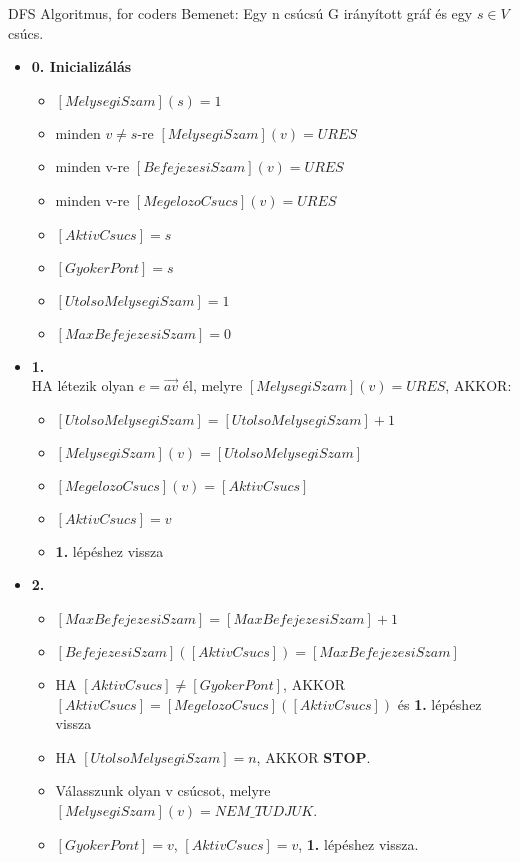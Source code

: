 \begin{tetel}{DFS Algoritmus, for coders}
Bemenet: Egy n csúcsú G irányított gráf és egy $s \in V$ csúcs.
\begin{itemize}
\item{\textbf{0. Inicializálás}}
  \begin{itemize}
  \item $[MelysegiSzam](s) = 1$
  \item minden $v \neq s$-re $[MelysegiSzam](v) = URES$
  \item minden v-re $[BefejezesiSzam](v) = URES$
  \item minden v-re $[MegelozoCsucs](v) = URES$
  \item $[AktivCsucs]=s$
  \item $[GyokerPont] = s$
  \item $[UtolsoMelysegiSzam] = 1$
  \item $[MaxBefejezesiSzam] = 0$
  \end{itemize}
\item{\textbf{1.}}
\\
HA létezik olyan $e = \overrightarrow{av}$ él, melyre $[MelysegiSzam](v) = URES$, AKKOR:
	\begin{itemize}
	\item $[UtolsoMelysegiSzam] = [UtolsoMelysegiSzam] + 1$
	\item $[MelysegiSzam](v) = [UtolsoMelysegiSzam]$
	\item $[MegelozoCsucs](v) = [AktivCsucs]$
	\item $[AktivCsucs] = v$
	\item \textbf{1.} lépéshez vissza
	\end{itemize}
\item{\textbf{2.}}
	\begin{itemize}
	\item $[MaxBefejezesiSzam] = [MaxBefejezesiSzam] + 1$
	\item $[BefejezesiSzam]([AktivCsucs]) = [MaxBefejezesiSzam]$
	\item HA $[AktivCsucs] \neq [GyokerPont]$, AKKOR $[AktivCsucs] = [MegelozoCsucs]([AktivCsucs])$ és \textbf{1.} lépéshez vissza
	\item HA $[UtolsoMelysegiSzam] = n$, AKKOR \textbf{STOP}.
	\item Válasszunk olyan v csúcsot, melyre $[MelysegiSzam](v) = NEM\_TUDJUK$.
	\item $[GyokerPont] = v$, $[AktivCsucs] = v$, \textbf{1.} lépéshez vissza.
	\end{itemize}
\end{itemize}
\end{tetel}

